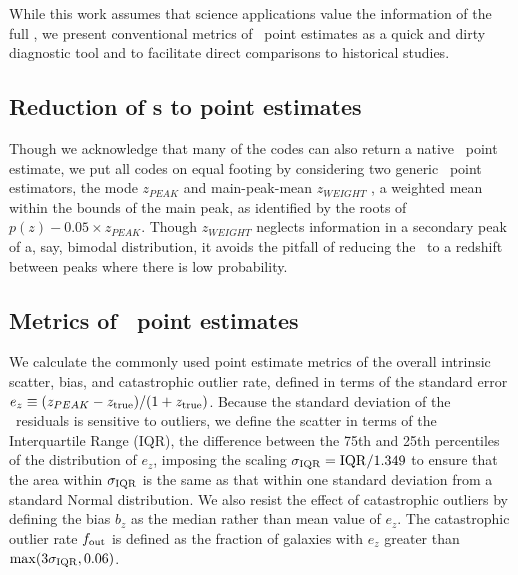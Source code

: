 While this work assumes that science applications value the information of the full \pzpdf, we present conventional metrics of \pz\ point estimates as a quick and dirty diagnostic tool and to facilitate direct comparisons to historical studies.

\subsection{Reduction of \pzpdf s to point estimates}
\label{sec:pointest}

Though we acknowledge that many of the codes can also return a native \pz\ point estimate, we put all codes on equal footing by considering two generic \pz\ point estimators, the mode $z_{PEAK}$ and main-peak-mean $z_{WEIGHT}$ \citep{Dahlen:13}, a weighted mean within the bounds of the main peak, as identified by the roots of $p(z) - 0.05 \times z_{PEAK}$.
Though $z_{WEIGHT}$ neglects information in a secondary peak of a, say, bimodal distribution, it avoids the pitfall of reducing the \pzpdf\ to a redshift between peaks where there is low probability.

\subsection{Metrics of \pz\ point estimates}
\label{sec:point_metrics}

We calculate the commonly used point estimate metrics of the overall intrinsic scatter, bias, and catastrophic outlier rate, defined in terms of the standard error $e_{z} \equiv (z_{PEAK} - z_{\rm true}) / (1 + z_{\rm true})$.
Because the standard deviation of the \pz\ residuals is sensitive to outliers, we define the scatter in terms of the Interquartile Range (IQR), the difference between the 75th and 25th percentiles of the distribution of $e_{z}$, imposing the scaling $\sigma_{\rm IQR} = \rm{IQR} / 1.349$ to ensure that the area within $\sigma_{\rm IQR}$ is the same as that within one standard deviation from a standard Normal distribution.
We also resist the effect of catastrophic outliers by defining the bias $b_{z}$ as the median rather than mean value of $e_{z}$.
The catastrophic outlier rate $f_{\rm out}$ is defined as the fraction of galaxies with $e_{z}$ greater than $\max(3 \sigma_{\rm IQR}, 0.06)$.

